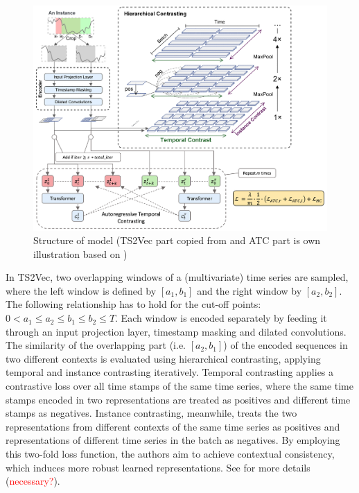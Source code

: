 \documentclass{article}
\begin{document}
\begin{figure}[H]
  \centering
  \includegraphics[width=1.0\textwidth]{fig/model_setup.png}
  \caption{Structure of model (TS2Vec part copied from \citet{ts2vec} and ATC part is own illustration based on \citet{tstcc})}
\end{figure}

In TS2Vec, two overlapping windows of a (multivariate) time series are sampled, where the left window is defined by $[a_{1}, b_{1}]$ and the right window by $[a_{2}, b_{2}]$. The following relationship has to hold for the cut-off points: $0 < a_{1} \leq a_{2} \leq b_{1} \leq b_{2} \leq T$. Each window is encoded separately by feeding it through an input projection layer, timestamp masking and dilated convolutions. The similarity of the overlapping part (i.e. $[a_{2}, b_{1}]$) of the encoded sequences in two different contexts is evaluated using hierarchical contrasting, applying temporal and instance contrasting iteratively. Temporal contrasting applies a contrastive loss over all time stamps of the same time series, where the same time stamps encoded in two representations are treated as positives and different time stamps as negatives. Instance contrasting, meanwhile, treats the two representations from different contexts of the same time series as positives and representations of different time series in the batch as negatives. By employing this two-fold loss function, the authors aim to achieve contextual consistency, which induces more robust learned representations. See \citet{ts2vec} for more details (\textcolor{red}{necessary?}). \\
\end{document}

